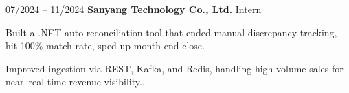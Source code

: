 \begin{twocolentry}{07/2024 – 11/2024} \textbf{Sanyang Technology Co., Ltd.}
    \newline Intern \end{twocolentry}
\begin{onecolentry}
\begin{highlights}
\item Built a .NET auto-reconciliation tool that ended manual discrepancy tracking, hit 100\% match rate, sped up month-end close.
\item Improved ingestion via REST, Kafka, and Redis, handling high-volume sales for near–real-time revenue visibility..
\end{highlights}
\end{onecolentry}

